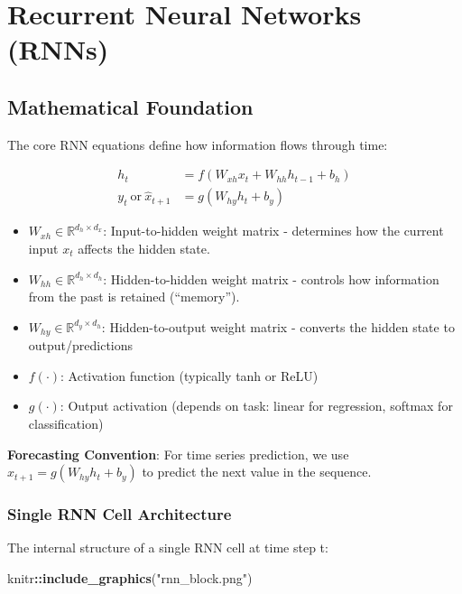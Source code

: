 \documentclass[
]{article}
\newenvironment{Shaded}{\begin{snugshade}}{\end{snugshade}}
\newcommand{\FunctionTok}[1]{\textcolor[rgb]{0.13,0.29,0.53}{\textbf{#1}}}
\newcommand{\NormalTok}[1]{#1}
\newcommand{\SpecialCharTok}[1]{\textcolor[rgb]{0.81,0.36,0.00}{\textbf{#1}}}
\newcommand{\StringTok}[1]{\textcolor[rgb]{0.31,0.60,0.02}{#1}}
\providecommand{\tightlist}{%
  \setlength{\itemsep}{0pt}\setlength{\parskip}{0pt}}
\begin{document}
\section{Recurrent Neural Networks
(RNNs)}\label{recurrent-neural-networks-rnns}

\subsection{Mathematical Foundation}\label{mathematical-foundation}

The core RNN equations define how information flows through time:

\[\begin{aligned}
h_t &= f\!\left(W_{xh}x_t + W_{hh}h_{t-1} + b_h\right) \\
y_t \ \text{or}\ \hat{x}_{t+1} &= g\!\left(W_{hy}h_t + b_y\right)
\end{aligned}\]

\begin{itemize}
\tightlist
\item
  \(W_{xh} \in \mathbb{R}^{d_h\times d_x}\): Input-to-hidden weight
  matrix - determines how the current input \(x_{t}\) affects the hidden
  state.
\item
  \(W_{hh} \in \mathbb{R}^{d_h\times d_h}\): Hidden-to-hidden weight
  matrix - controls how information from the past is retained
  (``memory'').
\item
  \(W_{hy} \in \mathbb{R}^{d_y\times d_h}\): Hidden-to-output weight
  matrix - converts the hidden state to output/predictions
\item
  \(f(\cdot)\): Activation function (typically tanh or ReLU)
\item
  \(g(\cdot)\): Output activation (depends on task: linear for
  regression, softmax for classification)
\end{itemize}

\textbf{Forecasting Convention}: For time series prediction, we use
\(\hat{x}_{t+1} = g(W_{hy}h_t + b_y)\) to predict the next value in the
sequence.

\subsubsection{Single RNN Cell
Architecture}\label{single-rnn-cell-architecture}

The internal structure of a single RNN cell at time step t:

\begin{Shaded}
\begin{Highlighting}[]
\NormalTok{knitr}\SpecialCharTok{::}\FunctionTok{include\_graphics}\NormalTok{(}\StringTok{"rnn\_block.png"}\NormalTok{)}
\end{Highlighting}
\end{Shaded}
\end{document}
